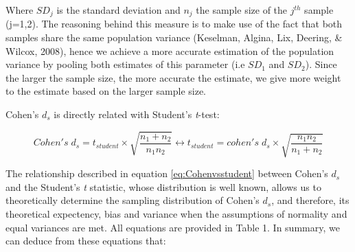 \documentclass[
  man,floatsintext]{apa6}
\begin{document}
Where \(SD_j\) is the standard deviation and \(n_j\) the sample size of the \(j^{th}\) sample (j=1,2). The reasoning behind this measure is to make use of the fact that both samples share the same population variance (Keselman, Algina, Lix, Deering, \& Wilcox, 2008), hence we achieve a more accurate estimation of the population variance by pooling both estimates of this parameter (i.e \(SD_1\) and \(SD_2\)). Since the larger the sample size, the more accurate the estimate, we give more weight to the estimate based on the larger sample size.

Cohen's \(d_{s}\) is directly related with Student's \emph{t}-test:

\begin{equation} 
Cohen's \; d_s = t_{student} \times \sqrt{\frac{n_1+n_2}{n_1n_2}} \leftrightarrow t_{student} = cohen's \; d_s \times \sqrt{\frac{n_1n_2}{n_1+n_2}}
\label{eq:Cohenvsstudent}
\end{equation}

The relationship described in equation \ref{eq:Cohenvsstudent} between Cohen's \(d_s\) and the Student's \emph{t} statistic, whose distribution is well known, allows us to theoretically determine the sampling distribution of Cohen's \(d_s\), and therefore, its theoretical expectency, bias and variance when the assumptions of normality and equal variances are met. All equations are provided in Table 1. In summary, we can deduce from these equations that:
\end{document}
